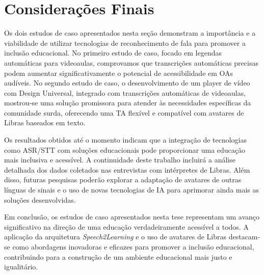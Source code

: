\section{Considerações Finais}

Os dois estudos de caso apresentados nesta seção demonstram a importância e a viabilidade de utilizar tecnologias de reconhecimento de fala para promover a inclusão educacional. No primeiro estudo de caso, focado em legendas automáticas para videoaulas, comprovamos que transcrições automáticas precisas podem aumentar significativamente o potencial de acessibilidade em OAs audíveis. No segundo estudo de caso, o desenvolvimento de um player de vídeo com Design Universal, integrado com transcrições automáticas de videoaulas, mostrou-se uma solução promissora para atender às necessidades específicas da comunidade surda, oferecendo uma TA flexível e compatível com avatares de Libras baseados em texto.

Os resultados obtidos até o momento indicam que a integração de tecnologias como ASR/STT com soluções educacionais pode proporcionar uma educação mais inclusiva e acessível. A continuidade deste trabalho incluirá a análise detalhada dos dados coletados nas entrevistas com intérpretes de Libras. Além disso, futuras pesquisas poderão explorar a adaptação de avatares de outras línguas de sinais e o uso de novas tecnologias de IA para aprimorar ainda mais as soluções desenvolvidas.

Em conclusão, os estudos de caso apresentados nesta tese representam um avanço significativo na direção de uma educação verdadeiramente acessível a todos. A aplicação da arquitetura \textit{Speech2Learning} e o uso de avatares de Libras destacam-se como abordagens inovadoras e eficazes para promover a inclusão educacional, contribuindo para a construção de um ambiente educacional mais justo e igualitário.

